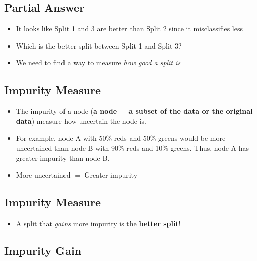 \documentclass[
]{article}
\providecommand{\tightlist}{%
  \setlength{\itemsep}{0pt}\setlength{\parskip}{0pt}}
\begin{document}
\hypertarget{partial-answer}{%
\subsection{Partial Answer}\label{partial-answer}}

\begin{itemize}
\tightlist
\item
  It looks like Split 1 and 3 are better than Split 2 since it
  misclassifies less
\item
  Which is the better split between Split 1 and Split 3?
\item
  We need to find a way to measure \emph{how good a split is}
\end{itemize}

\hypertarget{impurity-measure}{%
\subsection{Impurity Measure}\label{impurity-measure}}

\begin{itemize}
\tightlist
\item
  The impurity of a node (\textbf{a node = a subset of the data or the
  original data}) measure how uncertain the node is.\\
\item
  For example, node A with 50\% reds and 50\% greens would be more
  uncertained than node B with 90\% reds and 10\% greens. Thus, node A
  has greater impurity than node B.
\item
  More uncertained \(=\) Greater impurity
\end{itemize}

\hypertarget{impurity-measure-1}{%
\subsection{Impurity Measure}\label{impurity-measure-1}}

\begin{itemize}
\tightlist
\item
  A split that \emph{gains} more impurity is the \textbf{better split}!
\end{itemize}

\hypertarget{impurity-gain}{%
\subsection{Impurity Gain}\label{impurity-gain}}
\end{document}

